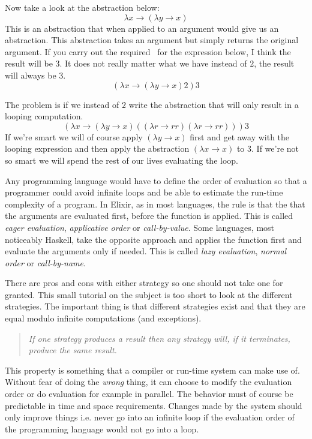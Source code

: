 \documentclass[a4paper,11pt]{article}
\begin{document}
Now take a look at the abstraction below:
$$\lambda x \rightarrow (\lambda y \rightarrow x)$$ 
This is an abstraction that when applied to an argument would give us
an abstraction. This abstraction takes an argument but simply returns
the original argument. If you carry out the required \betar\ for the
expression below, I think the result will be $3$. It does not really
matter what we have instead of $2$, the result will always be $3$.
$$(\lambda x \rightarrow (\lambda y \rightarrow x) 2) 3$$ 


The problem is if we instead of $2$ write the abstraction that will
only result in a looping computation.
$$(\lambda x \rightarrow (\lambda y \rightarrow x) ((\lambda r \rightarrow r r)(\lambda r \rightarrow r r)) ) 3$$ 
If we're smart we will of course apply $(\lambda y \rightarrow x)$
first and get away with the looping expression and then apply the
abstraction $(\lambda x \rightarrow x)$ to $3$. If we're not so smart
we will spend the rest of our lives evaluating the loop.

Any programming language would have to define the order of evaluation
so that a programmer could avoid infinite loops and be able to
estimate the run-time complexity of a program. In Elixir, as in most
languages, the rule is that the that the arguments are evaluated
first, before the function is applied. This is called {\em eager
  evaluation}, {\em applicative order} or {\em call-by-value}. Some
languages, most noticeably Haskell, take the opposite approach and
applies the function first and evaluate the arguments only if
needed. This is called {\em lazy evaluation}, {\em normal order} or
{\em call-by-name}.

There are pros and cons with either strategy so one should not take
one for granted. This small tutorial on the subject is too short to
look at the different strategies. The important thing is that
different strategies exist and that they are equal modulo infinite
computations (and exceptions).

\begin{quotation} {\em If one strategy produces a result then any
    strategy will, if it terminates, produce the same result. }
\end{quotation}

This property is something that a compiler or run-time system can make
use of. Without fear of doing the {\em wrong} thing, it can choose to
modify the evaluation order or do evaluation for example in
parallel. The behavior must of course be predictable in time and
space requirements. Changes made by the system should only improve
things i.e. never go into an infinite loop if the evaluation order of
the programming language would not go into a loop.
\end{document}
